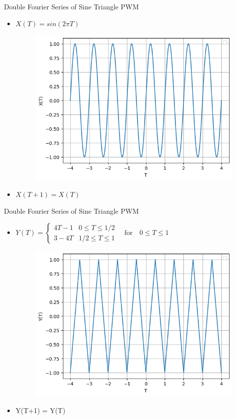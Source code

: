\documentclass{beamer}
\begin{document}
\begin{frame}{Double Fourier Series of Sine Triangle PWM}
\begin{itemize}
    \item $X(T) = sin(2\pi T)$\\
    \begin{figure}
        \centering
        \includegraphics[width= 0.8\linewidth]{X_T.png}
    \end{figure}
    \item $X(T+1) = X(T)$
\end{itemize}
\end{frame}
\begin{frame}{Double Fourier Series of Sine Triangle PWM}
\begin{itemize}
    \item $Y(T) = \begin{cases}
            4T-1&0 \leq T \leq 1/2\\
            3-4T&1/2 \leq T \leq 1
        \end{cases}
        \quad \text{for} \quad 0 \leq T \leq 1$
    \begin{figure}
        \centering
        \includegraphics[width= 0.7\linewidth]{Y_T.png}
    \end{figure}
    \item Y(T+1) = Y(T)
\end{itemize}
\end{frame}
\end{document}
